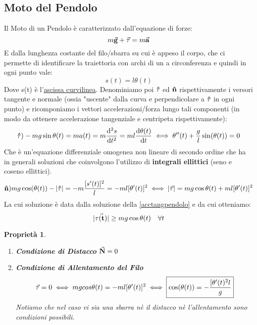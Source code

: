 \documentclass{article}
\newtheorem{property}{Proprietà}[section]
\renewcommand{\a}{\va{a}}
\newcommand{\normvs}{\vu{n}}
\newcommand{\normvt}{\va{N}}
\newcommand{\g}{\va{g}}
\begin{document}
\subsection{Moto del Pendolo}
Il Moto di un Pendolo è caratterizzato dall'equazione di forze:
\[m\g+\va{\tau}=m\a\]
E dalla lunghezza costante del filo/sbarra su cui è appeso il corpo, che ci permette di identificare la traiettoria con archi di un a circonferenza e quindi in ogni punto vale:
\[s(t)=l\theta(t)\]
Dove s(t) è l'\hyperlink{ascissacurv}{ascissa curvilinea}. Denominiamo poi $\vu{\tau}$ ed $\normvs$ rispettivamente i versori tangente e normale (ossia "uscente" dalla curva e perpendicolare a $\vu{\tau}$ in ogni punto) e ricomponiamo i vettori accelerazioni/forza lungo tali componenti (in modo da ottenere accelerazione tangenziale e centripeta rispettivamente):
\begin{equation}
\label{acctangpendolo}
\vu{\tau}) -mg\sin\theta(t)=ma(t)=m\dv[2]{s}{t}=ml\dv{\theta(t)}{t}\iff \theta''(t)+\frac{g}{l}\sin(\theta(t))=0
\end{equation}
Che è un'equazione differenziale omogenea non lineare di secondo ordine che ha in generali soluzioni che coinvolgono l'utilizzo di \textbf{integrali ellittici} (seno e coseno ellittici). 
\begin{equation}
\label{acccentrpendolo}
\normvs) mg\cos(\theta(t))-|\vu{\tau}|= -m\frac{[s'(t)]^2}{l}=-ml[\theta'(t)]^2 \iff |\va{\tau}|=mg\cos\theta(t)+ml[\theta'(t)]^2   
\end{equation}
La cui soluzione è data dalla soluzione della \ref{acctangpendolo} e da cui otteniamo:
\begin{equation}
|\va{\tau(t)}|\geq mg\cos\theta(t)\quad\forall t
\end{equation}


\begin{property}
\begin{enumerate}
    \item \textbf{Condizione di Distacco} \(\normvt=0\)
    \item \textbf{Condizione di Allentamento del Filo}
    \[\va{\tau}=0\iff mgcos\theta(t)=-ml[\theta'(t)]^2\iff \boxed{\cos(\theta(t))=-\frac{[\theta'(t)^2l}{g}}\]
    Notiamo che nel caso vi sia una sbarra nè il distacco nè l'allentamento sono condizioni possibili. 
\end{enumerate}
\end{property}
\end{document}
